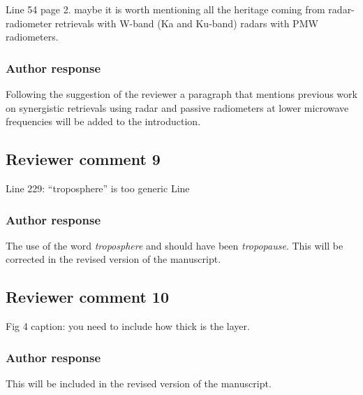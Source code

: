 \documentclass[11pt]{scrartcl}
\begin{document}
Line 54 page 2.  maybe it is worth mentioning all the heritage coming from radar-radiometer retrievals with W-band (Ka and Ku-band) radars with PMW radiometers. 

\subsubsection*{Author response}

Following the suggestion of the reviewer a paragraph that mentions previous work
on synergistic retrievals using radar and passive radiometers at lower microwave
frequencies will be added to the introduction.

%
%


\subsection*{Reviewer comment 9}
Line 229: “troposphere” is too generic Line

\subsubsection*{Author response}

The use of the word {\itshape troposphere} and should have been {\itshape tropopause}.
This will be corrected in the revised version of the manuscript.

\subsection*{Reviewer comment 10}
Fig 4 caption: you need to include how thick is the layer.

\subsubsection*{Author response}
This will be included in the revised version of the manuscript.

%
\end{document}
